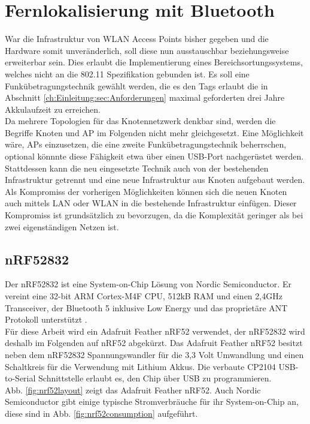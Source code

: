 \chapter{Fernlokalisierung mit Bluetooth}
\label{ch:phase3}
War die Infrastruktur von WLAN Access Points bisher gegeben und die Hardware somit unveränderlich, soll diese nun ausstauschbar beziehungsweise erweiterbar sein.
Dies erlaubt die Implementierung eines Bereichsortungssystems, welches nicht an die 802.11 Spezifikation gebunden ist.
Es soll eine Funkübetragungstechnik gewählt werden, die es den Tags erlaubt die in Abschnitt \ref{ch:Einleitung:sec:Anforderungen} maximal geforderten drei Jahre Akkulaufzeit zu erreichen.\\
Da mehrere Topologien für das Knotennetzwerk denkbar sind, werden die Begriffe Knoten und AP im Folgenden nicht mehr gleichgesetzt.
Eine Möglichkeit wäre, APs einzusetzen, die eine zweite Funkübetragungstechnik beherrschen, optional könnnte diese Fähigkeit etwa über einen USB-Port nachgerüstet werden.
Stattdessen kann die neu eingesetzte Technik auch von der bestehenden Infrastruktur getrennt und eine neue Infrastruktur aus Knoten aufgebaut werden.
Als Kompromiss der vorherigen Möglichkeiten können sich die neuen Knoten auch mittels LAN oder WLAN in die bestehende Infrastruktur einfügen. 
Dieser Kompromiss ist grundsätzlich zu bevorzugen, da die Komplexität geringer als bei zwei eigenständigen Netzen ist.

\section{nRF52832}
Der nRF52832 ist eine System-on-Chip Lösung von Nordic Semiconductor.
Er vereint eine 32-bit ARM Cortex-M4F CPU, 512kB RAM und einen 2,4GHz Transceiver, der Bluetooth 5 inklusive Low Energy und das proprietäre ANT Protokoll unterstützt \cite{nordic2017nrf}.\\
Für diese Arbeit wird ein Adafruit Feather nRF52 verwendet, der nRF52832 wird deshalb im Folgenden auf nRF52 abgekürzt.
Das Adafruit Feather nRF52 besitzt neben dem nRF52832 Spannungswandler für die 3,3 Volt Umwandlung und einen Schaltkreis für die Verwendung mit Lithium Akkus. Die verbaute CP2104 USB-to-Serial Schnittstelle erlaubt es, den Chip über USB zu programmieren.\\
Abb. \ref{fig:nrf52layout} zeigt das Adafruit Feather nRF52.
Auch Nordic Semiconductor gibt einige typische Stromverbräuche für ihr System-on-Chip an, diese sind in Abb. \ref{fig:nrf52consumption} aufgeführt.

